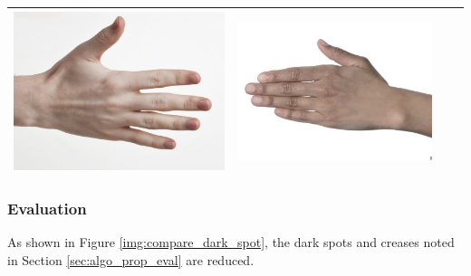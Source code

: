 \begin{longtable}{|c||c|c|c|}
\begin{minipage}{.29\textwidth}
    \includegraphics[width=\textwidth,height=\textheight,keepaspectratio]{../inputs/hand_pale.jpg}
  \end{minipage} & 
  \begin{minipage}{.29\textwidth}
    \includegraphics[width=\textwidth,height=\textheight,keepaspectratio]{../rc_test/outputs/20170522_proportional_corrected_test_alpha1p1/hand_brown_to_hand_pale.jpg}
  \end{minipage} \\
    \hline
\end{longtable}

\subsubsection*{Evaluation}
As shown in Figure \ref{img:compare_dark_spot}, the dark spots and creases noted in Section \ref{sec:algo_prop_eval} are reduced.

